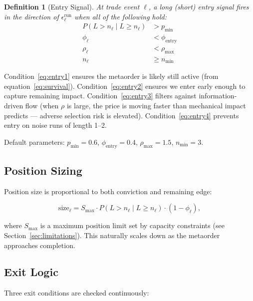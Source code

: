 \documentclass[12pt,a4paper]{article}
\newtheorem{definition}{Definition}
\begin{document}
\begin{definition}[Entry Signal]
At trade event $\ell$, a long (short) entry signal fires in the direction of
$\epsilon_\ell^{\text{run}}$ when all of the following hold:
\begin{align}
  P(L > n_\ell \mid L \geq n_\ell) &> p_{\min} \label{eq:entry1} \\
  \phi_\ell &< \phi_{\text{entry}} \label{eq:entry2} \\
  \rho_\ell &< \rho_{\max} \label{eq:entry3} \\
  n_\ell &\geq n_{\min} \label{eq:entry4}
\end{align}
\end{definition}

Condition~\eqref{eq:entry1} ensures the metaorder is likely still active (from
equation~\eqref{eq:survival}). Condition~\eqref{eq:entry2} ensures we enter
early enough to capture remaining impact. Condition~\eqref{eq:entry3} filters
against information-driven flow (when $\rho$ is large, the price is moving
faster than mechanical impact predicts --- adverse selection risk is elevated).
Condition~\eqref{eq:entry4} prevents entry on noise runs of length 1--2.

Default parameters: $p_{\min} = 0.6$, $\phi_{\text{entry}} = 0.4$,
$\rho_{\max} = 1.5$, $n_{\min} = 3$.

\subsection{Position Sizing}

Position size is proportional to both conviction and remaining edge:

\begin{equation}
  \text{size}_\ell = S_{\max} \cdot
    P(L > n_\ell \mid L \geq n_\ell) \cdot (1 - \phi_\ell),
  \label{eq:sizing}
\end{equation}

\noindent where $S_{\max}$ is a maximum position limit set by capacity
constraints (see Section~\ref{sec:limitations}). This naturally scales down
as the metaorder approaches completion.

\subsection{Exit Logic}

Three exit conditions are checked continuously:
\end{document}

